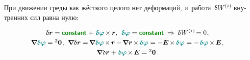 \begin{otherlanguage}{russian}
\vspace{-0.1em}
При движении среды как жёсткого целого нет деформаций, и~работа~$\variation{\internalwork}\hspace{-0.2ex}$ внутренних сил равна нулю:

\nopagebreak\vspace{-0.1em}\begin{equation*}
\begin{array}{c}
\variation{\currentlocationvector}
= \boldconstant \hspace{.1ex}
+ \hspace{.1ex} \littlerotationvector \hspace{-0.2ex} \times \hspace{-0.12ex} \locationvector ,
\:\,
\littlerotationvector = \boldconstant
\hspace{.64ex}\Rightarrow\hspace{.5ex}
\variation{\internalwork} \hspace{-0.2ex}
= 0 \hspace{.1ex} ,
\\[.25em]
%
\boldnabla \littlerotationvector
= \zerobivalent
\hspace{.1ex} ,
\:\,
\boldnabla \variation{\currentlocationvector}
= \hspace{-0.25ex} \boldnabla \littlerotationvector %
\hspace{-0.2ex} \times \hspace{-0.2ex} \locationvector
- \hspace{-0.25ex} \boldnabla \locationvector \hspace{-0.2ex} \times \hspace{-0.2ex} \littlerotationvector
= - \UnitDyad \hspace{-0.2ex} \times \hspace{-0.2ex} \littlerotationvector
= - \hspace{.2ex} \littlerotationvector \hspace{-0.2ex} \times \hspace{-0.2ex} \UnitDyad
\hspace{.1ex} ,
\\[.25em]
%
\boldnabla \variation{\currentlocationvector}
+ \littlerotationvector \hspace{-0.2ex} \times \hspace{-0.2ex} \UnitDyad
= \zerobivalent
\hspace{.1ex} .
\end{array}
\end{equation*}


\end{otherlanguage}
